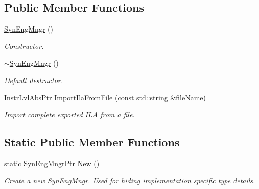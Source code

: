 \subsection*{Public Member Functions}
\begin{DoxyCompactItemize}
\item 
\mbox{\label{classilang_1_1_syn_eng_mngr_a3643344de3aed8661a91fcf88b86d8d3}} 
\mbox{\hyperlink{classilang_1_1_syn_eng_mngr_a3643344de3aed8661a91fcf88b86d8d3}{Syn\+Eng\+Mngr}} ()
\begin{DoxyCompactList}\small\item\em Constructor. \end{DoxyCompactList}\item 
\mbox{\label{classilang_1_1_syn_eng_mngr_a71fc2e13aef820b5cea2883cdb666cfb}} 
\mbox{\hyperlink{classilang_1_1_syn_eng_mngr_a71fc2e13aef820b5cea2883cdb666cfb}{$\sim$\+Syn\+Eng\+Mngr}} ()
\begin{DoxyCompactList}\small\item\em Default destructor. \end{DoxyCompactList}\item 
\mbox{\hyperlink{namespaceilang_ad1b30fdf347e493b3937143da05d1a72}{Instr\+Lvl\+Abs\+Ptr}} \mbox{\hyperlink{classilang_1_1_syn_eng_mngr_a01fbc4b3acceda0511cb499f7e1c2781}{Import\+Ila\+From\+File}} (const std\+::string \&file\+Name)
\begin{DoxyCompactList}\small\item\em Import complete exported I\+LA from a file. \end{DoxyCompactList}\end{DoxyCompactItemize}
\subsection*{Static Public Member Functions}
\begin{DoxyCompactItemize}
\item 
\mbox{\label{classilang_1_1_syn_eng_mngr_a9bc94510d83d6c472893993f474317cc}} 
static \mbox{\hyperlink{classilang_1_1_syn_eng_mngr_acaffa3e6981472cc6f0d8d5647dc1baf}{Syn\+Eng\+Mngr\+Ptr}} \mbox{\hyperlink{classilang_1_1_syn_eng_mngr_a9bc94510d83d6c472893993f474317cc}{New}} ()
\begin{DoxyCompactList}\small\item\em Create a new \mbox{\hyperlink{classilang_1_1_syn_eng_mngr}{Syn\+Eng\+Mngr}}. Used for hiding implementation specific type details. \end{DoxyCompactList}\end{DoxyCompactItemize}


